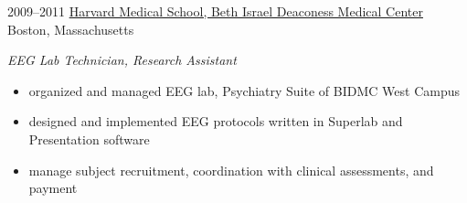 \documentclass[]{friggeri-cv}
\begin{document}
\begin{entrylist}
  \entry
	{2009--2011}
	{\href{http://www.bidmc.org/}{Harvard Medical School, Beth Israel Deaconess Medical Center}}
	{Boston, Massachusetts}
	{\emph{EEG Lab Technician, Research Assistant}
	\begin{itemize}
		\item organized and managed EEG lab, Psychiatry Suite of BIDMC West Campus
		\item designed and implemented EEG protocols written in Superlab and Presentation software 
		\item manage subject recruitment, coordination with clinical assessments, and payment
	\end{itemize}
	}

\end{entrylist}

\newpage
\end{document}
